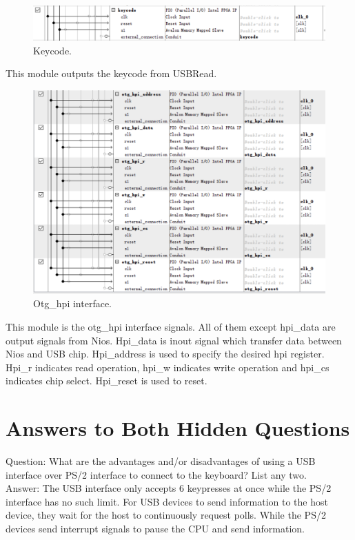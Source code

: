 \documentclass[12pt]{article}
\begin{document}
\begin{figure}[H]
    \centering
    \includegraphics[width=16cm]{keycode.png}
    \caption{Keycode.}
\end{figure}
This module outputs the keycode from USBRead.

\begin{figure}[H]
    \centering
    \includegraphics[width=16cm]{otg.png}
    \caption{Otg\_hpi interface.}
\end{figure}
This module is the otg\_hpi interface signals. All of them except hpi\_data are output signals from Nios. Hpi\_data is inout signal which transfer data between Nios and USB chip. Hpi\_address is used to specify the desired hpi register. Hpi\_r indicates read operation, hpi\_w indicates write operation and hpi\_cs indicates chip select. Hpi\_reset is used to reset.

\section{Answers to Both Hidden Questions}
Question: What are the advantages and/or disadvantages of using a USB interface over PS/2 interface to connect to the keyboard? List any two. \\

Answer: The USB interface only accepts 6 keypresses at once while the PS/2 interface has no such limit. For USB devices to send information to the host device, they wait for the host to continuously request polls. While the PS/2 devices send interrupt signals to pause the CPU and send information. \\
\end{document}
